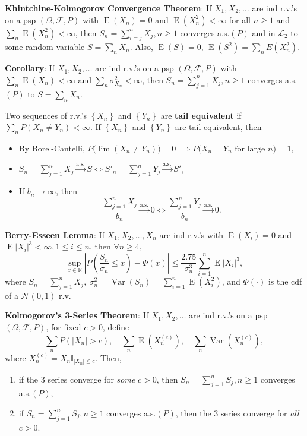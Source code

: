 \documentclass[paper=letter,fontsize=3mm]{scrartcl}
\DeclareMathOperator{\Var}{Var}
\DeclareMathOperator{\E}{E}
\newcommand{\convas}{\stackrel{\text{a.s.}}{\longrightarrow}}
\newcommand{\Norm}{\mathcal{N}}
\newcommand{\R}{\mathbb{R}}
\newcommand\indicate[1]{\mathbb{I}_{ #1 }}
\newcommand\abs[1]{\left| #1 \right|}
\newcommand\set[1]{\left\{ #1 \right\}}
\begin{document}
\begin{multicols*}{3}
\textbf{Khintchine-Kolmogorov Convergence Theorem}: If $X_1, X_2, \dots$ are ind r.v.\@'s on a psp $(\Omega, \mathcal{F}, P)$ with $\E(X_n) = 0$ and $\E(X_n^2) < \infty$ for all $n \ge 1$ and $\sum_n \E(X_n^2) < \infty$, then $S_n=\sum_{i=j}^n X_j, n\ge1$ converges a.s.$(P)$ and in $\mathcal{L}_2$ to some random variable $S = \sum_n X_n$. Also, $\E(S) = 0$, $\E(S^2) = \sum_n E(X_n^2)$. \\\medskip

\textbf{Corollary}: If $X_1, X_2, \dots$ are ind r.v.\@'s on a psp $(\Omega, \mathcal{F}, P)$ with $\sum_n \E(X_n) < \infty$ and $\sum_n \sigma^2_{X_n} < \infty$, then $S_n = \sum_{j=1}^n X_j, n\ge1$ converges a.s.$(P)$ to $S = \sum_n X_n$. \\\medskip

Two sequences of r.v.\@'s $\set{X_n}$ and $\set{Y_n}$ are \textbf{tail equivalent} if $\sum_n P(X_n \ne Y_n) < \infty$. If $\set{X_n}$ and $\set{Y_n}$ are tail equivalent, then
\begin{itemize}
\item By Borel-Cantelli, $P\big(\overline{\lim}(X_n \ne Y_n)\big) = 0 \implies P\big(X_n = Y_n \text{ for large } n\big) = 1$, 
\item $S_n = \sum_{j=1}^n X_j \convas S \iff S'_n = \sum_{j=1}^n Y_j \convas S'$,
\item If $b_n \to \infty$, then $$\frac{\sum_{j=1}^n X_j}{b_n} \convas 0 \iff \frac{\sum_{j=1}^n Y_j}{b_n} \convas 0.$$
\end{itemize}

\textbf{Berry-Esseen Lemma}: If $X_1, X_2, \dots, X_n$ are ind r.v.\@'s with $\E(X_i) = 0$ and $\E\abs{X_i}^3 < \infty, 1 \le i \le n$, then $\forall n \ge 4$,
$$\sup_{x\in\R} \abs{P\left(\frac{S_n}{\sigma_n} \le x \right) - \Phi(x)} \le \frac{2.75}{\sigma^3_n}\sum_{i=1}^n \E\abs{X_i}^3,$$
where $S_n = \sum_{j=1}^n X_j, ~\sigma^2_n = \Var(S_n) = \sum_{i=1}^n \E(X_i^2)$, and $\Phi(\cdot)$ is the cdf of a $\Norm(0,1)$ r.v. \\\bigskip

\textbf{Kolmogorov's 3-Series Theorem}: If $X_1, X_2, \dots$ are ind r.v.\@'s on a psp $(\Omega, \mathcal{F}, P)$, for fixed $c > 0$, define
$$\sum_n P(\abs{X_n} > c), \quad \sum_n \E(X_n^{(c)}), \quad \sum_n \Var(X_n^{(c)}),$$
where $X_n^{(c)} = X_n \indicate{\abs{X_n} \le c}$. Then,
\begin{enumerate}
\item if the 3 series converge for \emph{some} $c > 0$, then $S_n = \sum_{j=1}^n S_j, n\ge1$ converges a.s.$(P)$,
\item if $S_n = \sum_{j=1}^n S_j, n\ge1$ converges a.s.$(P)$, then the 3 series converge for \emph{all} $c > 0$.
\end{enumerate}


\end{multicols*}
\end{document}
